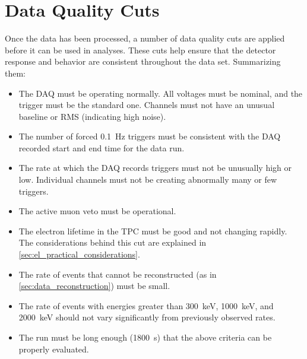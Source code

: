 \documentclass[herrin-thesis.tex]{subfiles}
\begin{document}
\section{Data Quality Cuts}
\label{sec:data_quality_cuts}
Once the data has been processed, a number of data quality cuts are applied before it can be used in analyses. These cuts help ensure that the detector response and behavior are consistent throughout the data set. Summarizing them:
\begin{itemize}
\item The DAQ must be operating normally. All voltages must be nominal, and the trigger must be the standard one. Channels must not have an unusual baseline or RMS (indicating high noise).
\item The number of forced \SI{0.1}{\Hz} triggers must be consistent with the DAQ recorded start and end time for the data run.
\item The rate at which the DAQ records triggers must not be unusually high or low. Individual channels must not be creating abnormally many or few triggers.
\item The active muon veto must be operational.
\item The electron lifetime in the TPC must be good and not changing rapidly. The considerations behind this cut are explained in \cref{sec:el_practical_considerations}.
\item The rate of events that cannot be reconstructed (as in \cref{sec:data_reconstruction}) must be small.
\item The rate of events with energies greater than \SI{300}{\keV}, \SI{1000}{\keV}, and \SI{2000}{\keV} should not vary significantly from previously observed rates.
\item The run must be long enough (\SI{1800}{\s}) that the above criteria can be properly evaluated.
\end{itemize}
\end{document}

